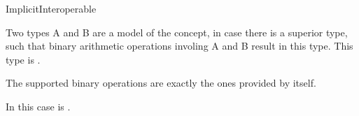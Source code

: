 \begin{ccRefConcept}{ImplicitInteroperable}

\ccDefinition

Two types A and B are a model of the  concept,
in case there is a superior type, such that binary arithmetic operations
involing A and B result in this type. 
This type is . 

The supported binary operations are exactly the ones provided by 
 itself. 

In this case  
is .

\ccRefines
 
\ccSeeAlso
{}\\
\\

\end{ccRefConcept}
